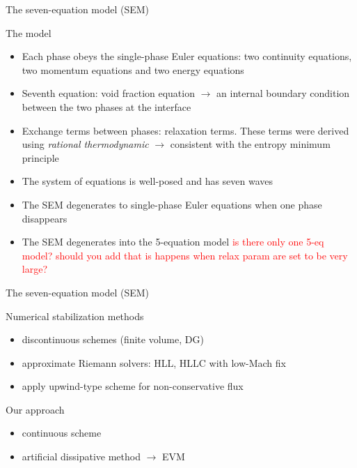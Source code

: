 \documentclass[xcolor=dvipsnames,10pt]{beamer}
\newcommand{\tcr}[1]{\textcolor{red}{#1}}
\begin{document}
\begin{frame}{The seven-equation model (SEM)}
\begin{block}{The model}
\begin{itemize}
\setlength{\itemsep}{10pt}
\item Each phase obeys the single-phase Euler equations: two continuity equations, two momentum equations and two energy equations
\item Seventh equation: void fraction equation $\rightarrow$ an internal boundary condition between the two phases at the interface
\item Exchange terms between phases: relaxation terms. These terms were derived using \emph{rational thermodynamic} $\rightarrow$ consistent with the entropy minimum principle
\item {\color{red}The system of equations is well-posed and has seven waves}
\item The SEM degenerates to single-phase Euler equations when one phase disappears
\item The SEM degenerates into the 5-equation model \tcr{is there only one 5-eq model? should you add that is happens when relax param are set to be very large?}
\end{itemize}
\end{block}
\end{frame}
\begin{frame}{The seven-equation model (SEM)}
\begin{block}{Numerical stabilization methods}
\begin{itemize}
\setlength{\itemsep}{10pt}
\item discontinuous schemes (finite volume, DG)
\item approximate Riemann solvers: HLL, HLLC with low-Mach fix
\item apply upwind-type scheme for non-conservative flux
\end{itemize}
\end{block}
\begin{block}{Our approach}
\begin{itemize}
\setlength{\itemsep}{10pt}
\item continuous scheme
\item artificial dissipative method $\longrightarrow$ EVM
\end{itemize}
\end{block}
\end{frame}
\end{document}
